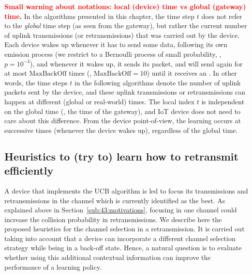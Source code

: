 \begin{leftbar}[warningbar]  %
		\textbf{\textcolor{red}{Small warning about notations: local (device) time vs global (gateway) time}.}
		In the algorithms presented in this chapter, the time step $t$ does not refer to the \emph{global} time step (as seen from the gateway), but rather the current number of uplink transmissions (or retransmissions) that was carried out by the device.
		Each device wakes up whenever it has to send some data, following its own emission process (we restrict to a Bernoulli process of small probability, \eg, $p=10^{-3}$), and whenever it wakes up, it sends its packet, and will send again for at most $\mathrm{MaxBackOff}$ times (\eg, $\mathrm{MaxBackOff}=10$) until it receives an \Ack.
		In other words, the time steps $t$ in the following algorithms denote the number of uplink packets sent by the device, and these uplink transmissions or retransmissions can happen at different (global or real-world) times.
		The local index $t$ is independent on the global time (\ie, the time of the gateway), and IoT device does not need to care about this difference.
		From the device point-of-view, the learning occurs at successive times (whenever the device wakes up), regardless of the global time.
\end{leftbar}  %


\subsection{Heuristics to (try to) learn how to retransmit efficiently}
\label{sub:43:heuristics}

A device that implements the UCB algorithm is led to focus its transmissions and retransmissions in the channel which is currently identified as the best.
As explained above in Section~\ref{sub:43:motivations}, focusing in one channel could increase the collision probability in retransmissions.
We describe here the proposed heuristics for the channel selection in a retransmission. It is carried out taking into account that a device can incorporate a different channel selection strategy while being in a back-off state.
Hence, a natural question is to evaluate whether using this additional contextual information can improve the performance of a learning policy.

